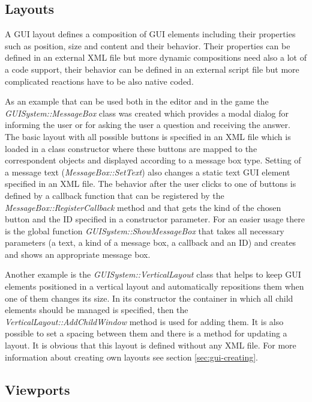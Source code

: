 \subsection{Layouts}
\label{sec:gui-layouts}

A GUI layout defines a composition of GUI elements including their properties such as position, size and content and their behavior. Their properties can be defined in an external XML file but more dynamic compositions need also a lot of a code support, their behavior can be defined in an external script file but more complicated reactions have to be also native coded.

As an example that can be used both in the editor and in the game the \emph{GUISystem::MessageBox} class was created which provides a modal dialog for informing the user or for asking the user a question and receiving the answer. The basic layout with all possible buttons is specified in an XML file which is loaded in a class constructor where these buttons are mapped to the correspondent objects and displayed according to a message box type. Setting of a message text (\emph{MessageBox::SetText}) also changes a static text GUI element specified in an XML file. The behavior after the user clicks to one of buttons is defined by a callback function that can be registered by the \emph{MessageBox::RegisterCallback} method and that gets the kind of the chosen button and the ID specified in a constructor parameter. For an easier usage there is the global function \emph{GUISystem::ShowMessageBox} that takes all necessary parameters (a text, a kind of a message box, a callback and an ID) and creates and shows an appropriate message box.

Another example is the \emph{GUISystem::VerticalLayout} class that helps to keep GUI elements positioned in a vertical layout and automatically repositions them when one of them changes its size. In its constructor the container in which all child elements should be managed is specified, then the \emph{VerticalLayout::AddChildWindow} method is used for adding them. It is also possible to set a spacing between them and there is a method for updating a layout. It is obvious that this layout is defined without any XML file. For more information about creating own layouts see section \ref{sec:gui-creating}.

\subsection{Viewports}

